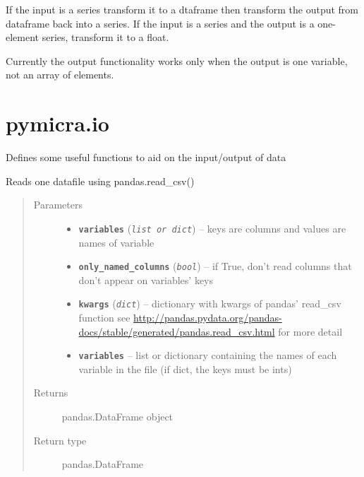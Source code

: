 \documentclass[a4paper,10pt,oneside]{sphinxmanual}
\begin{document}

\begin{fulllineitems}
\label{pymicra:pymicra.decorators.pdgeneral_io}
If the input is a series transform it to a dtaframe then transform the output from dataframe
back into a series. If the input is a series and the output is a one-element series, transform it to a float.

Currently the output functionality works only when the output is one variable, not an array
of elements.

\end{fulllineitems}



\section{pymicra.io}
\label{pymicra:pymicra-io}\label{pymicra:module-pymicra.io}
Defines some useful functions to aid on the input/output of data

\begin{fulllineitems}
\label{pymicra:pymicra.io.readDataFile}
Reads one datafile using pandas.read\_csv()
\begin{quote}\begin{description}
\item[{Parameters}] \leavevmode\begin{itemize}
\item {} 
\textbf{\texttt{variables}} (\emph{\texttt{list or dict}}) -- keys are columns and values are names of variable

\item {} 
\textbf{\texttt{only\_named\_columns}} (\emph{\texttt{bool}}) -- if True, don't read columns that don't appear on variables' keys

\item {} 
\textbf{\texttt{kwargs}} (\emph{\texttt{dict}}) -- dictionary with kwargs of pandas' read\_csv function
see \url{http://pandas.pydata.org/pandas-docs/stable/generated/pandas.read\_csv.html} for more detail

\item {} 
\textbf{\texttt{variables}} -- list or dictionary containing the names of each variable in the file (if dict, the keys must be ints)

\end{itemize}

\item[{Returns}] \leavevmode
pandas.DataFrame object

\item[{Return type}] \leavevmode
pandas.DataFrame

\end{description}\end{quote}

\end{fulllineitems}
\end{document}
